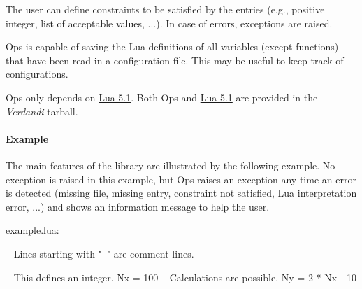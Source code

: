 \documentclass{tufte-book}
\begin{document}
\begin{itemize}
The user can define constraints to be satisfied by the entries (e.g., positive integer, list of acceptable values, ...). In case of errors, exceptions are raised.

Ops is capable of saving the Lua definitions of all variables (except functions) that have been read in a configuration file. This may be useful to keep track of configurations.


Ops only depends on \href{http://www.lua.org/}{Lua 5.1}. Both Ops and \href{http://www.lua.org/}{Lua 5.1} are provided in the  \-\emph{Verdandi} tarball.

\hypertarget{configuration_files_basic_use}{}\paragraph{\-Example}\label{configuration_files_basic_use}

The main features of the library are illustrated by the following example. No exception is raised in this example, but Ops raises an exception any time an error is detected (missing file, missing entry, constraint not satisfied, Lua interpretation error, ...) and shows an information message to help the user.

example.lua:


 \begin{frame_lua}
-- Lines starting with "--" are comment lines.

-- This defines an integer.
Nx = 100
-- Calculations are possible.
Ny = 2 * Nx - 10


\end{frame_lua}
\end{itemize}
\end{document}
